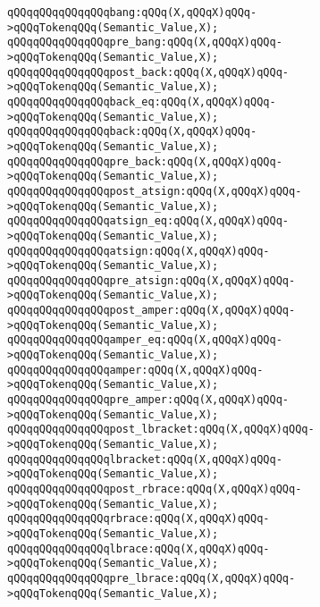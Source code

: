\verb|qQQqqQQqqQQqqQQqbang:qQQq(X,qQQqX)qQQq->qQQqTokenqQQq(Semantic_Value,X);|\newline
\verb|qQQqqQQqqQQqqQQqpre_bang:qQQq(X,qQQqX)qQQq->qQQqTokenqQQq(Semantic_Value,X);|\newline
\verb|qQQqqQQqqQQqqQQqpost_back:qQQq(X,qQQqX)qQQq->qQQqTokenqQQq(Semantic_Value,X);|\newline
\verb|qQQqqQQqqQQqqQQqback_eq:qQQq(X,qQQqX)qQQq->qQQqTokenqQQq(Semantic_Value,X);|\newline
\verb|qQQqqQQqqQQqqQQqback:qQQq(X,qQQqX)qQQq->qQQqTokenqQQq(Semantic_Value,X);|\newline
\verb|qQQqqQQqqQQqqQQqpre_back:qQQq(X,qQQqX)qQQq->qQQqTokenqQQq(Semantic_Value,X);|\newline
\verb|qQQqqQQqqQQqqQQqpost_atsign:qQQq(X,qQQqX)qQQq->qQQqTokenqQQq(Semantic_Value,X);|\newline
\verb|qQQqqQQqqQQqqQQqatsign_eq:qQQq(X,qQQqX)qQQq->qQQqTokenqQQq(Semantic_Value,X);|\newline
\verb|qQQqqQQqqQQqqQQqatsign:qQQq(X,qQQqX)qQQq->qQQqTokenqQQq(Semantic_Value,X);|\newline
\verb|qQQqqQQqqQQqqQQqpre_atsign:qQQq(X,qQQqX)qQQq->qQQqTokenqQQq(Semantic_Value,X);|\newline
\verb|qQQqqQQqqQQqqQQqpost_amper:qQQq(X,qQQqX)qQQq->qQQqTokenqQQq(Semantic_Value,X);|\newline
\verb|qQQqqQQqqQQqqQQqamper_eq:qQQq(X,qQQqX)qQQq->qQQqTokenqQQq(Semantic_Value,X);|\newline
\verb|qQQqqQQqqQQqqQQqamper:qQQq(X,qQQqX)qQQq->qQQqTokenqQQq(Semantic_Value,X);|\newline
\verb|qQQqqQQqqQQqqQQqpre_amper:qQQq(X,qQQqX)qQQq->qQQqTokenqQQq(Semantic_Value,X);|\newline
\verb|qQQqqQQqqQQqqQQqpost_lbracket:qQQq(X,qQQqX)qQQq->qQQqTokenqQQq(Semantic_Value,X);|\newline
\verb|qQQqqQQqqQQqqQQqlbracket:qQQq(X,qQQqX)qQQq->qQQqTokenqQQq(Semantic_Value,X);|\newline
\verb|qQQqqQQqqQQqqQQqpost_rbrace:qQQq(X,qQQqX)qQQq->qQQqTokenqQQq(Semantic_Value,X);|\newline
\verb|qQQqqQQqqQQqqQQqrbrace:qQQq(X,qQQqX)qQQq->qQQqTokenqQQq(Semantic_Value,X);|\newline
\verb|qQQqqQQqqQQqqQQqlbrace:qQQq(X,qQQqX)qQQq->qQQqTokenqQQq(Semantic_Value,X);|\newline
\verb|qQQqqQQqqQQqqQQqpre_lbrace:qQQq(X,qQQqX)qQQq->qQQqTokenqQQq(Semantic_Value,X);|\newline
